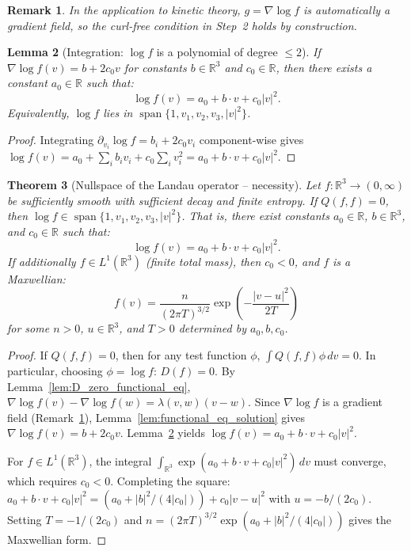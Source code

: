 \documentclass[11pt]{article}
\newcommand{\R}{\mathbb{R}}
\newtheorem{theorem}{Theorem}
\newtheorem{lemma}[theorem]{Lemma}
\newtheorem{remark}[theorem]{Remark}
\begin{document}
\begin{remark}
\label{rem:curl_free}
In the application to kinetic theory, $g = \nabla \log f$ is automatically a gradient field, so the curl-free condition in Step~2 holds by construction.
\end{remark}

\begin{lemma}[Integration: $\log f$ is a polynomial of degree $\leq 2$]
\label{lem:log_f_quadratic}
If $\nabla \log f(v) = b + 2c_0 v$ for constants $b \in \R^3$ and $c_0 \in \R$, then there exists a constant $a_0 \in \R$ such that:
\[
\log f(v) = a_0 + b \cdot v + c_0 |v|^2.
\]
Equivalently, $\log f$ lies in $\operatorname{span}\{1, v_1, v_2, v_3, |v|^2\}$.
\end{lemma}

\begin{proof}
Integrating $\partial_{v_i} \log f = b_i + 2c_0 v_i$ component-wise gives $\log f(v) = a_0 + \sum_i b_i v_i + c_0 \sum_i v_i^2 = a_0 + b \cdot v + c_0 |v|^2$.
\end{proof}

\begin{theorem}[Nullspace of the Landau operator -- necessity]
\label{thm:nullspace_necessity}
Let $f : \R^3 \to (0, \infty)$ be sufficiently smooth with sufficient decay and finite entropy. If $Q(f, f) = 0$, then $\log f \in \operatorname{span}\{1, v_1, v_2, v_3, |v|^2\}$. That is, there exist constants $a_0 \in \R$, $b \in \R^3$, and $c_0 \in \R$ such that:
\[
\log f(v) = a_0 + b \cdot v + c_0 |v|^2.
\]
If additionally $f \in L^1(\R^3)$ (finite total mass), then $c_0 < 0$, and $f$ is a Maxwellian:
\[
f(v) = \frac{n}{(2\pi T)^{3/2}} \exp\!\left(-\frac{|v - u|^2}{2T}\right)
\]
for some $n > 0$, $u \in \R^3$, and $T > 0$ determined by $a_0, b, c_0$.
\end{theorem}

\begin{proof}
If $Q(f,f) = 0$, then for any test function $\phi$, $\int Q(f,f) \phi \, dv = 0$. In particular, choosing $\phi = \log f$: $D(f) = 0$. By Lemma~\ref{lem:D_zero_functional_eq}, $\nabla \log f(v) - \nabla \log f(w) = \lambda(v,w)(v-w)$. Since $\nabla \log f$ is a gradient field (Remark~\ref{rem:curl_free}), Lemma~\ref{lem:functional_eq_solution} gives $\nabla \log f(v) = b + 2c_0 v$. Lemma~\ref{lem:log_f_quadratic} yields $\log f(v) = a_0 + b \cdot v + c_0 |v|^2$.

For $f \in L^1(\R^3)$, the integral $\int_{\R^3} \exp(a_0 + b \cdot v + c_0 |v|^2) \, dv$ must converge, which requires $c_0 < 0$. Completing the square: $a_0 + b \cdot v + c_0 |v|^2 = (a_0 + |b|^2/(4|c_0|)) + c_0 |v - u|^2$ with $u = -b/(2c_0)$. Setting $T = -1/(2c_0)$ and $n = (2\pi T)^{3/2} \exp(a_0 + |b|^2/(4|c_0|))$ gives the Maxwellian form.
\end{proof}
\end{document}
